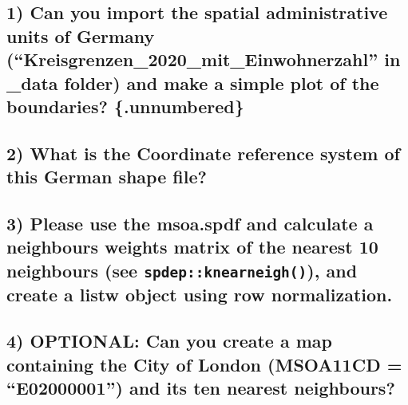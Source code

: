 \documentclass[
  letterpaper,
  DIV=11,
  numbers=noendperiod]{scrreprt}
\begin{document}
\hypertarget{can-you-import-the-spatial-administrative-units-of-germany-kreisgrenzen_2020_mit_einwohnerzahl-in-_data-folder-and-make-a-simple-plot-of-the-boundaries-.unnumbered}{%
\subsection{1) Can you import the spatial administrative units of
Germany (``Kreisgrenzen\_2020\_mit\_Einwohnerzahl'' in \_data folder)
and make a simple plot of the boundaries?
\{.unnumbered\}}\label{can-you-import-the-spatial-administrative-units-of-germany-kreisgrenzen_2020_mit_einwohnerzahl-in-_data-folder-and-make-a-simple-plot-of-the-boundaries-.unnumbered}}

\hypertarget{what-is-the-coordinate-reference-system-of-this-german-shape-file}{%
\subsection*{2) What is the Coordinate reference system of this German
shape
file?}\label{what-is-the-coordinate-reference-system-of-this-german-shape-file}}

\hypertarget{please-use-the-msoa.spdf-and-calculate-a-neighbours-weights-matrix-of-the-nearest-10-neighbours-see-spdepknearneigh-and-create-a-listw-object-using-row-normalization.}{%
\subsection*{\texorpdfstring{3) Please use the msoa.spdf and calculate a
neighbours weights matrix of the nearest 10 neighbours (see
\texttt{spdep::knearneigh()}), and create a listw object using row
normalization.}{3) Please use the msoa.spdf and calculate a neighbours weights matrix of the nearest 10 neighbours (see spdep::knearneigh()), and create a listw object using row normalization.}}\label{please-use-the-msoa.spdf-and-calculate-a-neighbours-weights-matrix-of-the-nearest-10-neighbours-see-spdepknearneigh-and-create-a-listw-object-using-row-normalization.}}

\hypertarget{optional-can-you-create-a-map-containing-the-city-of-london-msoa11cd-e02000001-and-its-ten-nearest-neighbours}{%
\subsection*{4) OPTIONAL: Can you create a map containing the City of
London (MSOA11CD = ``E02000001'') and its ten nearest
neighbours?}\label{optional-can-you-create-a-map-containing-the-city-of-london-msoa11cd-e02000001-and-its-ten-nearest-neighbours}}
\end{document}
